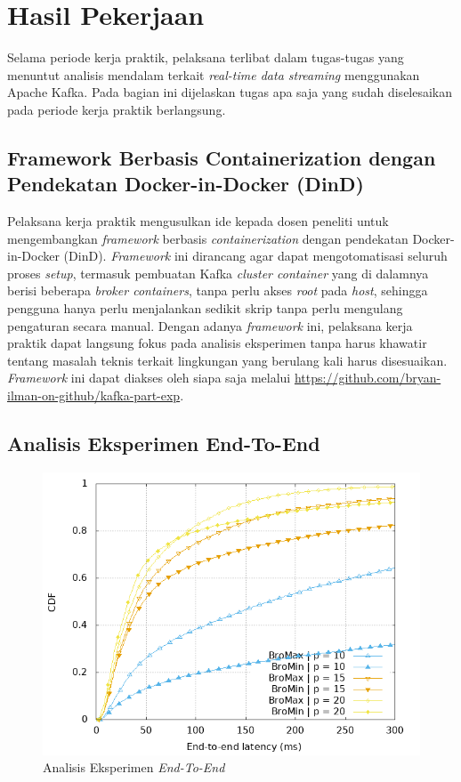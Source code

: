 \section{Hasil Pekerjaan}

Selama periode kerja praktik, pelaksana terlibat dalam tugas-tugas yang menuntut analisis mendalam terkait \textit{real-time data streaming} menggunakan Apache Kafka. Pada bagian ini dijelaskan tugas apa saja yang sudah diselesaikan pada periode kerja praktik berlangsung.

\subsection{Framework Berbasis Containerization dengan Pendekatan Docker-in-Docker (DinD)}

Pelaksana kerja praktik mengusulkan ide kepada dosen peneliti untuk mengembangkan \textit{framework} berbasis \textit{containerization} dengan pendekatan Docker-in-Docker (DinD). \textit{Framework} ini dirancang agar dapat mengotomatisasi seluruh proses \textit{setup}, termasuk pembuatan Kafka \textit{cluster container} yang di dalamnya berisi beberapa \textit{broker containers}, tanpa perlu akses \textit{root} pada \textit{host}, sehingga pengguna hanya perlu menjalankan sedikit skrip tanpa perlu mengulang pengaturan secara manual. Dengan adanya \textit{framework} ini, pelaksana kerja praktik dapat langsung fokus pada analisis eksperimen tanpa harus khawatir tentang masalah teknis terkait lingkungan yang berulang kali harus disesuaikan. \textit{Framework} ini dapat diakses oleh siapa saja melalui \textcolor{blue}{\href{https://github.com/bryan-ilman-on-github/kafka-part-exp}{https://github.com/bryan-ilman-on-github/kafka-part-exp}}.

\subsection{Analisis Eksperimen End-To-End}

\begin{figure}
	\centering
	\includegraphics[width=1\textwidth]
	{assets/pics/latency-cdf.png}
	\caption{Analisis Eksperimen \textit{End-To-End}}
	\label{fig:latency-cdf}
\end{figure}

